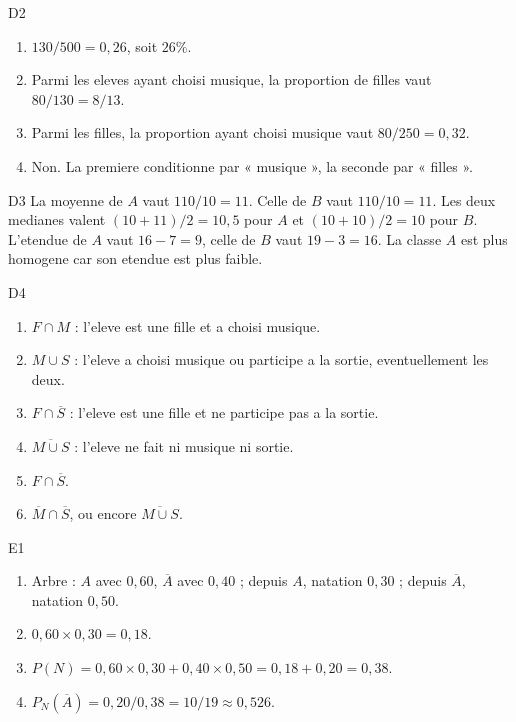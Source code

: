\documentclass[11pt,a4paper]{article}
\begin{document}
\begin{corrige}{D2}
\begin{enumerate}
    \item $130/500=0,26$, soit $26\%$.
    \item Parmi les eleves ayant choisi musique, la proportion de filles vaut $80/130=8/13$.
    \item Parmi les filles, la proportion ayant choisi musique vaut $80/250=0,32$.
    \item Non. La premiere conditionne par « musique », la seconde par « filles ».
\end{enumerate}
\end{corrige}

\begin{corrige}{D3}
La moyenne de $A$ vaut $110/10=11$. Celle de $B$ vaut $110/10=11$. Les deux medianes valent $(10+11)/2=10,5$ pour $A$ et $(10+10)/2=10$ pour $B$. L'etendue de $A$ vaut $16-7=9$, celle de $B$ vaut $19-3=16$. La classe $A$ est plus homogene car son etendue est plus faible.
\end{corrige}

\begin{corrige}{D4}
\begin{enumerate}
    \item $F\cap M$ : l'eleve est une fille et a choisi musique.
    \item $M\cup S$ : l'eleve a choisi musique ou participe a la sortie, eventuellement les deux.
    \item $F\cap\overline S$ : l'eleve est une fille et ne participe pas a la sortie.
    \item $\overline{M\cup S}$ : l'eleve ne fait ni musique ni sortie.
    \item $F\cap\overline S$.
    \item $\overline M\cap\overline S$, ou encore $\overline{M\cup S}$.
\end{enumerate}
\end{corrige}

\begin{corrige}{E1}
\begin{enumerate}
    \item Arbre : $A$ avec $0,60$, $\overline A$ avec $0,40$ ; depuis $A$, natation $0,30$ ; depuis $\overline A$, natation $0,50$.
    \item $0,60\times0,30=0,18$.
    \item $P(N)=0,60\times0,30+0,40\times0,50=0,18+0,20=0,38$.
    \item $P_N(\overline A)=0,20/0,38=10/19\approx0,526$.
\end{enumerate}
\end{corrige}
\end{document}
